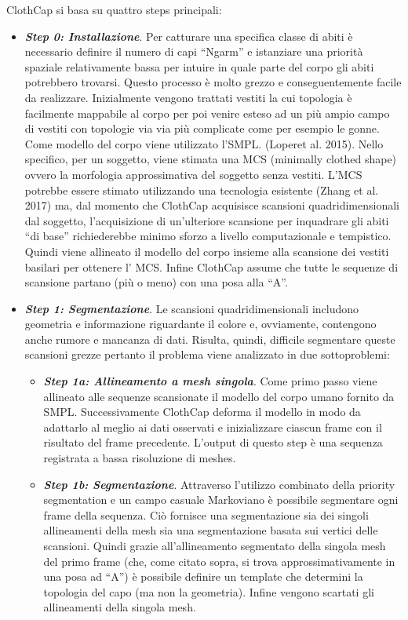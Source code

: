 \medskip

ClothCap si basa su quattro steps principali:

\medskip

\begin{itemize}
    \item \textbf{\textit{Step 0: Installazione}}. Per catturare una specifica classe di abiti è necessario definire il numero di capi “Ngarm”  e istanziare una priorità spaziale relativamente bassa per intuire in quale parte del corpo gli abiti potrebbero trovarsi. Questo processo è molto grezzo e conseguentemente facile da realizzare. Inizialmente vengono trattati vestiti la cui topologia è facilmente mappabile al corpo per poi venire esteso ad un più ampio campo di vestiti con topologie via via più complicate come per esempio le gonne.
    Come modello del corpo viene utilizzato l’SMPL. (Loperet al. 2015).
    Nello specifico, per un soggetto, viene stimata una MCS (minimally clothed shape) ovvero la morfologia approssimativa del soggetto senza vestiti.
    L’MCS potrebbe essere stimato utilizzando una tecnologia esistente (Zhang et al. 2017) ma, dal momento che ClothCap acquisisce scansioni quadridimensionali dal soggetto, l’acquisizione di un’ulteriore scansione per inquadrare gli abiti “di base” richiederebbe minimo sforzo a livello computazionale e tempistico. Quindi viene allineato il modello del corpo insieme alla scansione dei vestiti basilari per ottenere l’ MCS. Infine ClothCap assume che tutte le sequenze di scansione partano (più o meno) con una posa alla “A”.
    \item \textbf{\textit{Step 1: Segmentazione}}.
    Le scansioni quadridimensionali includono geometria e informazione riguardante il colore e, ovviamente, contengono anche rumore e mancanza di dati. Risulta, quindi, difficile segmentare queste scansioni grezze pertanto il problema viene analizzato in due sottoproblemi:
    \begin{itemize}
        \item \textbf{\textit{Step 1a: Allineamento a mesh singola}}. Come primo passo viene allineato alle sequenze scansionate il modello del corpo umano fornito da SMPL. Successivamente ClothCap deforma il modello in modo da adattarlo al meglio ai dati osservati e inizializzare ciascun frame con il risultato del frame precedente. L’output di questo step è una sequenza registrata a bassa risoluzione di meshes.
        \item \textbf{\textit{Step 1b: Segmentazione}}. Attraverso l’utilizzo combinato della priority segmentation e un campo casuale Markoviano è possibile segmentare ogni frame della sequenza. Ciò fornisce una segmentazione sia dei singoli allineamenti della mesh sia una segmentazione basata sui vertici delle scansioni. Quindi grazie all’allineamento segmentato della singola mesh del primo frame (che, come citato sopra, si trova approssimativamente in una posa ad “A”) è possibile definire un template che determini la topologia del capo (ma non la geometria). Infine vengono scartati gli allineamenti della singola mesh.
        

\end{itemize}
\end{itemize}
